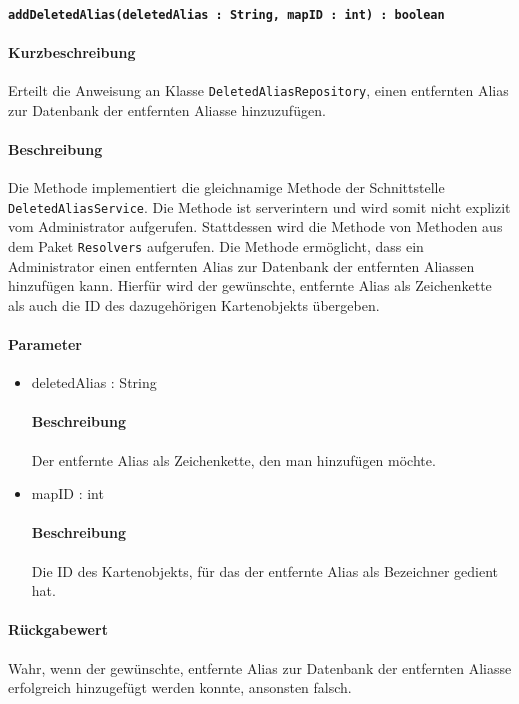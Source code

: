 \paragraph*{\texttt{addDeletedAlias(deletedAlias : String, mapID : int) : boolean}}%
\paragraph*{Kurzbeschreibung}
Erteilt die Anweisung an Klasse \texttt{DeletedAliasRepository}, einen entfernten Alias zur Datenbank der entfernten Aliasse hinzuzufügen.
\paragraph*{Beschreibung}
Die Methode implementiert die gleichnamige Methode der Schnittstelle \texttt{DeletedAliasService}.
Die Methode ist serverintern und wird somit nicht explizit vom Administrator aufgerufen.
Stattdessen wird die Methode von Methoden aus dem Paket \texttt{Resolvers} aufgerufen.
Die Methode ermöglicht, dass ein Administrator einen entfernten Alias zur Datenbank der entfernten Aliassen hinzufügen kann.
Hierfür wird der gewünschte, entfernte Alias als Zeichenkette als auch die ID des dazugehörigen Kartenobjekts übergeben.
\paragraph*{Parameter}
\begin{itemize}
    \item deletedAlias : String
    		\paragraph*{Beschreibung}
    		Der entfernte Alias als Zeichenkette, den man hinzufügen möchte.
    \item mapID : int
    		\paragraph*{Beschreibung}
    		Die ID des Kartenobjekts, für das der entfernte Alias als Bezeichner gedient hat.
\end{itemize}
\paragraph*{Rückgabewert}
Wahr, wenn der gewünschte, entfernte Alias zur Datenbank der entfernten Aliasse erfolgreich hinzugefügt werden konnte, ansonsten falsch.
